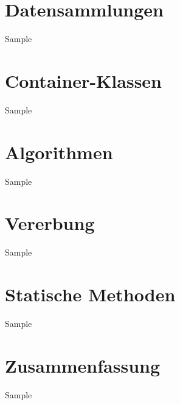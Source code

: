 \documentclass{hswbeamer}
\begin{document}
\section{Datensammlungen}
\begin{frame}{Sample}
\end{frame}

\section{Container-Klassen}
\begin{frame}{Sample}
\end{frame}

\section{Algorithmen}
\begin{frame}{Sample}
\end{frame}

\section{Vererbung}
\begin{frame}{Sample}
\end{frame}

\section{Statische Methoden}
\begin{frame}{Sample}
\end{frame}

\section{Zusammenfassung}
\begin{frame}{Sample}
\end{frame}
\end{document}
